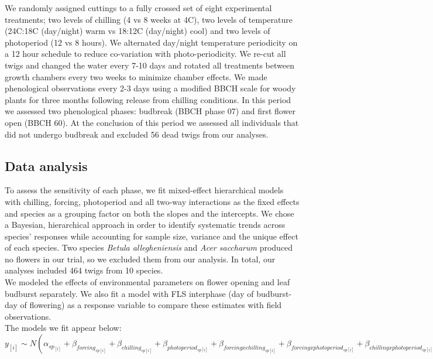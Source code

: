 \documentclass[11pt]{article}\usepackage[]{graphicx}\usepackage[]{color}
\begin{document}
\noindent We randomly assigned cuttings to a fully crossed set of eight experimental treatments; two levels of chilling (4 vs 8 weeks at 4\degree C), two levels of temperature (24\degree C:18\degree C (day/night) warm vs 18\degree:12\degree C (day/night) cool) and two levels of photoperiod (12 vs 8 hours). We alternated day/night temperature periodicity on a 12 hour schedule to reduce co-variation with photo-periodicity. We re-cut all twigs and changed the water every 7-10 days and rotated all treatments between growth chambers every two weeks to minimize chamber effects. We made phenological observations every 2-3 days using a modified BBCH scale for woody plants \citep{Finn2007} for three months following release from chilling conditions. In this period we assessed two phenological phases: budbreak (BBCH phase 07) %
and first flower open (BBCH 60). At the conclusion of this period we assessed all individuals that did not undergo budbreak and excluded 56 dead twigs from our analyses. 

\subsection*{Data analysis}
\noindent To assess the sensitivity of each phase, we fit mixed-effect hierarchical models with chilling, forcing, photoperiod and all two-way interactions as the fixed effects and species as a grouping factor on both the slopes and the intercepts. We chose a Bayesian, hierarchical approach in order to identify systematic trends across species' responses while accounting for sample size, variance and the unique effect of each species. Two species \textit{Betula allegheniensis} and \textit{Acer saccharum} produced no flowers in our trial, so we excluded them from our analysis. In total, our analyses included 464 twigs from 10 species. \\

\noident We modeled the effects of environmental parameters on flower opening and leaf budburst separately. We also fit a model with FLS interphase (day of budburst- day of flowering) as a response variable to compare these estimates with field observations.\\

The models we fit appear below:\\

$y_{[i]} \sim N(\alpha_{sp_{[i]}}+\beta_{forcing_{sp[i]}}+\beta_{chilling_{sp[i]}}+\beta_{photoperiod_{sp[i]}}+\beta_{forcing x chilling_{sp[i]}}+\beta_{forcing x photoperiod_{sp[i]}}+\beta_{chilling x photoperiod_{sp[i]}}, \sigma_y^2)$\\
\end{document}
